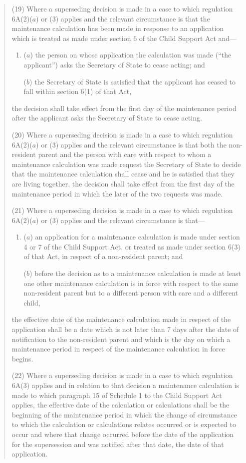\documentclass[12pt,a4paper]{article}
\begin{document}
\begin{quotation}
(19) Where a superseding decision is made in a case to which regulation 6A(2)($a$)  or (3) applies and the relevant circumstance is that the maintenance calculation has been made in response to an application which is treated as made under section 6 of the Child Support Act and—
\begin{enumerate}\item[]
($a$) the person on whose application the calculation was made (“the applicant”) asks the Secretary of State to cease acting; and

($b$) the Secretary of State is satisfied that the applicant has ceased to fall within section 6(1) of that Act,
\end{enumerate}
the decision shall take effect from the first day of the maintenance period after the applicant asks the Secretary of State to cease acting.

(20) Where a superseding decision is made in a case to which regulation 6A(2)($a$)  or (3) applies and the relevant circumstance is that both the non-resident parent and the person with care with respect to whom a maintenance calculation was made request the Secretary of State to decide that the maintenance calculation shall cease and he is satisfied that they are living together, the decision shall take effect from the first day of the maintenance period in which the later of the two requests was made.

(21) Where a superseding decision is made in a case to which regulation 6A(2)($a$)  or (3) applies and the relevant circumstance is that—
\begin{enumerate}\item[]
($a$) an application for a maintenance calculation is made under section 4 or 7 of the Child Support Act, or treated as made under section 6(3) of that Act, in respect of a non-resident parent; and

($b$) before the decision as to a maintenance calculation is made at least one other maintenance calculation is in force with respect to the same non-resident parent but to a different person with care and a different child,
\end{enumerate}
the effective date of the maintenance calculation made in respect of the application shall be a date which is not later than 7 days after the date of notification to the non-resident parent and which is the day on which a maintenance period in respect of the maintenance calculation in force begins.

(22) Where a superseding decision is made in a case to which regulation 6A(3) applies and in relation to that decision a maintenance calculation is made to which paragraph 15 of Schedule 1 to the Child Support Act applies, the effective date of the calculation or calculations shall be the beginning of the maintenance period in which the change of circumstance to which the calculation or calculations relates occurred or is expected to occur and where that change occurred before the date of the application for the supersession and was notified after that date, the date of that application.


\end{quotation}
\end{document}
